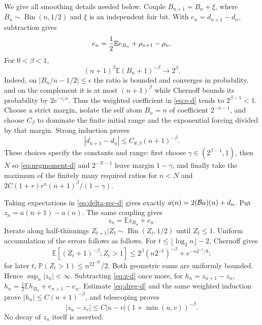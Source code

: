 \documentclass[11pt]{article}
\numberwithin{equation}{section}
\newcommand{\1}{\mathbf 1}\newcommand{\F}{\mathcal F}\newcommand{\D}{\mathcal D}
\begin{document}
We give all smoothing details needed below.  Couple
$B_{n+1}=B_n+\xi$, where $B_n\sim\operatorname{Bin}(n,1/2)$ and $\xi$ is an
independent fair bit.  With $e_n=d_{n+1}-d_n$, subtraction gives
\begin{equation}e_n={1\over2}\mathbb Ee_{B_n}+\rho_{n+1}-\rho_n.\label{eq:e-d}\end{equation}
For $0<\beta<1$,
\begin{equation}(n+1)^\beta\mathbb E(B_n+1)^{-\beta}\longrightarrow2^\beta.
\label{eq:negmoment-d}\end{equation}
Indeed, on $|B_n/n-1/2|\le\epsilon$ the ratio is bounded and converges in
probability, and on the complement it is at most $(n+1)^\beta$ while
Chernoff bounds its probability by $2e^{-c_\epsilon n}$.  Thus the weighted
coefficient in \eqref{eq:e-d} tends to $2^{\beta-1}<1$.  Choose a strict
margin, isolate the self atom $B_n=n$ of coefficient $2^{-n-1}$, and choose
$C_\beta$ to dominate the finite initial range and the exponential forcing
divided by that margin.  Strong induction proves
\begin{equation}|d_{n+1}-d_n|\le C_{\theta,\beta}(n+1)^{-\beta}.\label{eq:dreg-d}\end{equation}
These choices specify the constants and range: first choose
$\gamma\in(2^{\beta-1},1)$, then $N$ so \eqref{eq:negmoment-d} and
$2^{-N-1}$ leave margin $1-\gamma$, and finally take the maximum of the
finitely many required ratios for $n<N$ and $2C(1+r)r^n(n+1)^\beta/(1-\gamma)$.

Taking expectations in \eqref{eq:delta-rec-d} gives exactly
$a(n)=2({\cal B}a)(n)+d_n$.  Put $z_n=a(n+1)-a(n)$.  The same coupling gives
\begin{equation}z_n=\mathbb Ez_{B_n}+e_n.\label{eq:z-d}\end{equation}
Iterate along half-thinnings $Z_{t+1}|Z_t\sim\operatorname{Bin}(Z_t,1/2)$
until $Z_t\le1$.  Uniform accumulation of the errors follows as follows.
For $t\le\lfloor\log_2n\rfloor-2$, Chernoff gives
\[
 \mathbb E[(Z_t+1)^{-\beta};Z_t>1]
 \le2^\beta(n2^{-t})^{-\beta}+e^{-n2^{-t}/8};
\]
for later $t$, $\mathbb P(Z_t>1)\le n^22^{-2t}/2$.  Both geometric sums are
uniformly bounded.  Hence $\sup_n|z_n|<\infty$.  Subtracting \eqref{eq:z-d}
once more, for $h_n=z_{n+1}-z_n$,
$h_n=\frac12\mathbb Eh_{B_n}+e_{n+1}-e_n$.  Estimate \eqref{eq:dreg-d} and
the same weighted induction prove $|h_n|\le C(n+1)^{-\beta}$, and telescoping
proves
\begin{equation}|z_u-z_v|\le C|u-v|(1+\min(u,v))^{-\beta}.\label{eq:zreg-d}\end{equation}
No decay of $z_n$ itself is asserted.
\end{document}
